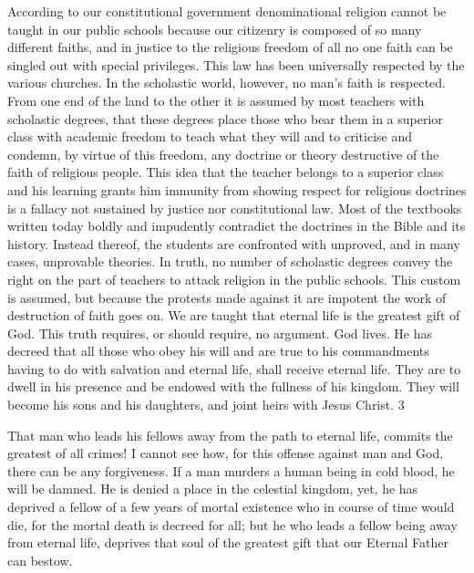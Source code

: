 According to our constitutional government denominational religion cannot be taught in our
public schools because our citizenry is composed of so many different faiths, and in justice to
the religious freedom of all no one faith can be singled out with special privileges. This law
has been universally respected by the various churches. In the scholastic world, however, no
man's faith is respected. From one end of the land to the other it is assumed by most teachers
with scholastic degrees, that these degrees place those who bear them in a superior class with
academic freedom to teach what they will and to criticise and condemn, by virtue of this
freedom, any doctrine or theory destructive of the faith of religious people. This idea that the
teacher belongs to a superior class and his learning grants him immunity from showing
respect for religious doctrines is a fallacy not sustained by justice nor constitutional law.
Most of the textbooks written today boldly and impudently contradict the doctrines in the
Bible and its history. Instead thereof, the students are confronted with unproved, and in many
cases, unprovable theories. In truth, no number of scholastic degrees convey the right on the
part of teachers to attack religion in the public schools. This custom is assumed, but because
the protests made against it are impotent the work of destruction of faith goes on. We are
taught that eternal life is the greatest gift of God. This truth requires, or should require, no
argument. God lives. He has decreed that all those who obey his will and are true to his
commandments having to do with salvation and eternal life, shall receive eternal life. They
are to dwell in his presence and be endowed with the fullness of his kingdom. They will
become his sons and his daughters, and joint heirs with Jesus Christ. 3

That man who leads his fellows away from the path to eternal life, commits the greatest of all
crimes! I cannot see how, for this offense against man and God, there can be any forgiveness.
If a man murders a human being in cold blood, he will be damned. He is denied a place in the
celestial kingdom, yet, he has deprived a fellow of a few years of mortal existence who in
course of time would die, for the mortal death is decreed for all; but he who leads a fellow
being away from eternal life, deprives that soul of the greatest gift that our Eternal Father can
bestow.

